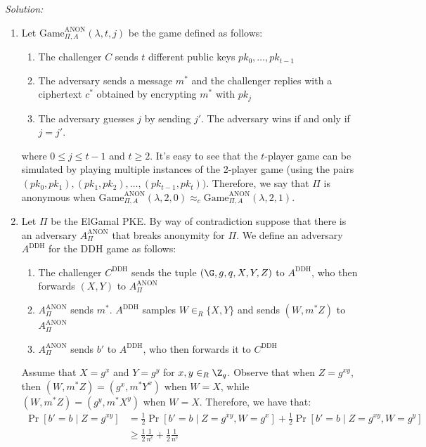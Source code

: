 \documentclass[a4paper, 12pt]{report}
\begin{document}
    \textit{Solution:} 
    
    \begin{enumerate}
        \item Let $\mathrm{Game}_{\Pi, A}^{\mathrm{ANON}}(\lambda, t, j)$ be the game defined as follows:
        \begin{enumerate}
            \item The challenger $C$ sends $t$ different public keys $pk_0, \ldots, pk_{t-1}$
            \item The adversary sends a message $m^*$ and the challenger replies with a ciphertext $c^*$ obtained by encrypting $m^*$ with $pk_j$
            \item The adversary guesses $j$ by sending $j'$. The adversary wins if and only if $j = j'$.
        \end{enumerate}
        where $0 \leq j \leq t-1$ and $t \geq 2$. It's easy to see that the $t$-player game can be simulated by playing multiple instances of the 2-player game (using the pairs $(pk_0,pk_1), (pk_1, pk_2), \ldots, (pk_{t-1}, pk_t))$. Therefore, we say that $\Pi$ is anonymous when $\mathrm{Game}_{\Pi, A}^{\mathrm{ANON}}(\lambda, 2, 0) \approx_c \mathrm{Game}_{\Pi, A}^{\mathrm{ANON}}(\lambda, 2, 1)$. 

        \item Let $\Pi$ be the ElGamal PKE. By way of contradiction suppose that there is an adversary $A^{\text{ANON}}_{\Pi}$ that breaks anonymity for $\Pi$. We define an adversary $A^{\text{DDH}}$ for the DDH game as follows:
        \begin{enumerate}
            \item The challenger $C^{\text{DDH}}$ sends the tuple $(\G, g, q, X, Y, Z)$ to $A^{\text{DDH}}$, who then forwards $(X,Y)$ to $A^{\text{ANON}}_{\Pi}$
            \item $A^{\text{ANON}}_{\Pi}$ sends $m^*$. $A^{\text{DDH}}$ samples $W \in_R \{X,Y\}$ and sends $(W, m^* Z)$ to $A^{\text{ANON}}_{\Pi}$
            \item $A^{\text{ANON}}_{\Pi}$ sends $b'$ to $A^{\text{DDH}}$, who then forwards it to $C^{\text{DDH}}$
        \end{enumerate}

        Assume that $X = g^x$ and $Y = g^y$ for $x,y \in_R \Z_q$. Observe that when $Z = g^{xy}$, then $(W, m^* Z) = (g^x, m^* Y^x)$ when $W = X$, while $(W, m^* Z) = (g^y, m^* X^y)$ when $W = X$. Therefore, we have that:
        \[\begin{split}
            \Pr[b' = b \mid Z = g^{xy}] &= \frac{1}{2} \Pr[b' = b \mid Z = g^{xy}, W = g^x] + \frac{1}{2} \Pr[b' = b \mid Z = g^{xy}, W = g^y] \\
            &\geq \frac{1}{2} \frac{1}{n^c} + \frac{1}{2} \frac{1}{n^c}
        \end{split}\]


\end{enumerate}
\end{document}
